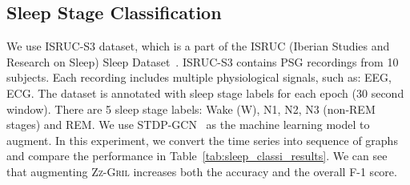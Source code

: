 \documentclass{article}
\newcommand{\zzgril}{\textsc{Zz-Gril}}
\theoremstyle{plain}
\theoremstyle{definition}
\theoremstyle{remark}
\begin{document}
\subsection{Sleep Stage Classification}
We use ISRUC-S3 dataset, which is a part of the ISRUC (Iberian Studies and Research on Sleep) Sleep Dataset~\cite{isruc}. 
ISRUC-S3 contains PSG recordings from 10 subjects. Each recording includes multiple physiological signals, such as: EEG, ECG. The dataset is annotated with sleep stage labels for each epoch (30 second window). There are 5 sleep stage labels: Wake (W), N1, N2, N3 (non-REM stages) and REM. We use  STDP-GCN~\cite{stdpgcn} as the machine learning model to augment. In this experiment, we convert the time series into sequence of graphs and compare the performance
in Table~\ref{tab:sleep_classi_results}. We can see that augmenting \zzgril{} increases both the accuracy and the overall F-1 score.
\end{document}
